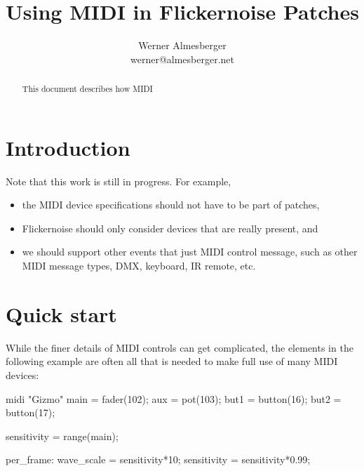 \documentclass[11pt,a4paper]{article}
\begin{document}
\title{Using MIDI in Flickernoise Patches}
\author{Werner Almesberger \\
  {\normalsize werner@almesberger.net}}

\maketitle

\begin{abstract}
This document describes how MIDI 
\end{abstract}

\tableofcontents



\section{Introduction}

Note that this work is still in progress. For example,
\begin{itemize}
  \item the MIDI device specifications should not have to be part of
    patches,
  \item Flickernoise should only consider devices that are really present, and
  \item we should support other events that just MIDI control message,
    such as other MIDI message types, DMX, keyboard, IR remote, etc.
\end{itemize}




\section{Quick start}

While the finer details of MIDI controls can get complicated, the
elements in the following example are often all that is needed to
make full use of many MIDI devices:

\begin{listing}{1}
midi "Gizmo" {
	main = fader(102);
	aux = pot(103);
	but1 = button(16);
	but2 = button(17);
}

sensitivity = range(main);

per_frame:
	wave_scale = sensitivity*10;
	sensitivity = sensitivity*0.99;
\end{listing}
\end{document}
